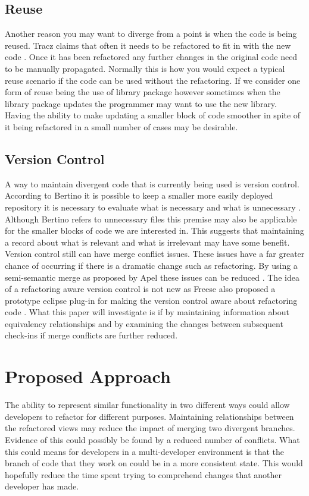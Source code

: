 \documentclass[12pt]{CRPITStyle}
\renewcommand{\cite}{\citep}
\begin{document}
\subsection{Reuse}
Another reason you may want to diverge from a point is when the code is being reused. Tracz claims that often it needs to be refactored to fit in with the new code \cite{Tracz1995}. Once it has been refactored any further changes in the original code need to be manually propagated. Normally this is how you would expect a typical reuse scenario if the code can be used without the refactoring. If we consider one form of reuse being the use of library package however sometimes when the library package updates the programmer may want to use the new library. Having the ability to make updating a smaller block of code smoother in spite of it being refactored in a small number of cases may be desirable. 
\subsection{Version Control} 
A way to maintain divergent code that is currently being used is version control. According to Bertino it is possible to keep a smaller more easily deployed repository it is necessary to evaluate what is necessary and what is unnecessary \cite{Bertino2012}. Although Bertino refers to unnecessary files this premise may also be applicable for the smaller blocks of code we are interested in. This suggests that maintaining a record about what is relevant and what is irrelevant may have some benefit. Version control still can have merge conflict issues. These issues have a far greater chance of occurring if there is a dramatic change such as refactoring. By using a semi-semantic merge as proposed by Apel these issues can be reduced \cite{Apel2011}. The idea of a refactoring aware version control is not new as Freese also proposed a prototype eclipse plug-in for making the version control aware about refactoring code \cite{Freese2006}. What this paper will investigate is if by maintaining information about equivalency relationships and by examining the changes between subsequent check-ins if merge conflicts are further reduced. 
\section{Proposed Approach}
The ability to represent similar functionality in two different ways could allow developers to refactor for different purposes. Maintaining relationships between the refactored views may reduce the impact of merging two divergent branches. Evidence of this could possibly be found by a reduced number of conflicts. What this could means for developers in a multi-developer environment is that the branch of code that they work on could be in a more consistent state. This would hopefully reduce the time spent trying to comprehend changes that another developer has made. 
\end{document}
